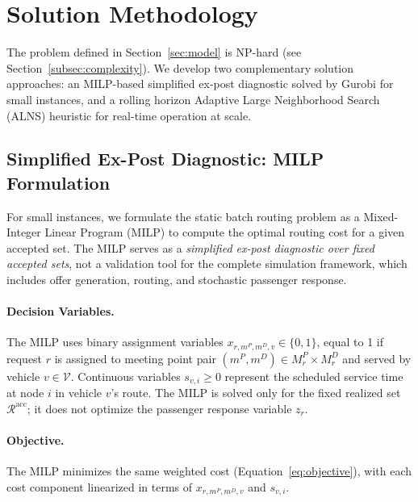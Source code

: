 
\section{Solution Methodology}\label{sec:algorithm}

The problem defined in Section~\ref{sec:model} is NP-hard (see
Section~\ref{subsec:complexity}). We develop two complementary solution approaches: an
MILP-based simplified ex-post diagnostic solved by Gurobi for small instances, and a rolling horizon
Adaptive Large Neighborhood Search (ALNS) heuristic for real-time operation at scale.

\subsection{Simplified Ex-Post Diagnostic: MILP Formulation}\label{subsec:milp}

For small instances, we formulate the static batch routing problem as a
Mixed-Integer Linear Program (MILP) to compute the optimal routing cost for a
given accepted set. The MILP serves as a \emph{simplified ex-post diagnostic over fixed accepted sets},
not a validation tool for the complete simulation framework, which includes
offer generation, routing, and stochastic passenger response.

\paragraph{Decision Variables.}
The MILP uses binary assignment variables $x_{r,m^P,m^D,v} \in \{0,1\}$, equal to 1 if
request $r$ is assigned to meeting point pair $(m^P, m^D) \in M_r^P \times M_r^D$ and
served by vehicle $v \in \mathcal{V}$. Continuous variables $s_{v,i} \geq 0$ represent
the scheduled service time at node $i$ in vehicle $v$'s route. The MILP is solved
only for the fixed realized set $\mathcal{R}^{\text{acc}}$; it does not optimize
the passenger response variable $z_r$.

\paragraph{Objective.}
The MILP minimizes the same weighted cost (Equation~\ref{eq:objective}), with each cost
component linearized in terms of $x_{r,m^P,m^D,v}$ and $s_{v,i}$.

